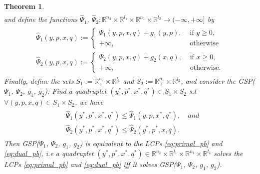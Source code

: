 \documentclass[a4paper,9pt]{extarticle}
\newtheorem{theorem}{Theorem}
\begin{document}
\begin{theorem}
\begin{equation}
\begin{split}
\end{split}
\end{equation}
and define the functions $\hat{\Psi}_1$, $\hat{\Psi}_2:
\mathbb{R}^{n_2} \times \mathbb{R}^{l_1} \times \mathbb{R}^{n_1}
\times \mathbb{R}^{l_2} \rightarrow (-\infty, +\infty]$ by
\begin{eqnarray}
  \begin{aligned}
    \hat{\Psi}_1(y, p, x, q) :=\begin{cases}
    \Psi_1(y, p, x, q)+ g_1(y, p), &\mbox{ if }y \ge 0,\\
    +\infty, &\mbox{ otherwise}\end{cases}\\
    \hat{\Psi}_2(y, p, x, q) :=\begin{cases}
    \Psi_2(y, p, x, q)+ g_2(x, q), &\mbox{ if }x \ge 0,\\
    +\infty, &\mbox{ otherwise.}\end{cases}
  \end{aligned}
\end{eqnarray}
Finally, define the sets $S_1 := \mathbb{R}^{n_2}_+ \times
\mathbb{R}^{l_1}$ and $S_2 := \mathbb{R}^{n_1}_+ \times
\mathbb{R}^{l_2}$, and consider the GSP($\Psi_1$, $\Psi_2$, $g_1$,
$g_2$): Find a quadruplet $(y^*,p^*, x^*, q^*) \in S_1 \times S_2$
s.t $\forall (y,p, x, q) \in S_1 \times S_2$, we have
\begin{eqnarray}
  \begin{split}
    &\hat{\Psi}_1(y^*, p^*, x^*, q^*) \le \hat{\Psi}_1(y, p, x^*,
    q^*),\hspace{1em}and\\
    &\hat{\Psi}_2(y^*, p^*, x^*, q^*)
    \le \hat{\Psi}_2(y^*, p^*, x, q).
  \label{eq:unconstrained_pb}
\end{split}
\end{eqnarray}
\label{thm:pd}
Then GSP($\Psi_1$,
  $\Psi_2$, $g_1$, $g_2$) is equivalent to the LCPs
  \eqref{eq:primal_pb} and \eqref{eq:dual_pb}, i.e
a quadruplet $(y^*,p^*, x^*, q^*) \in \mathbb{R}^{n_2}
  \times \mathbb{R}^{l_1} \times \mathbb{R}^{n_1} \times
  \mathbb{R}^{l_2}$ solves the LCPs
  \eqref{eq:primal_pb} and \eqref{eq:dual_pb} iff it solves
  GSP($\Psi_1$, $\Psi_2$, $g_1$, $g_2$). 
  \label{thm:pd}
\end{theorem}
\end{document}
